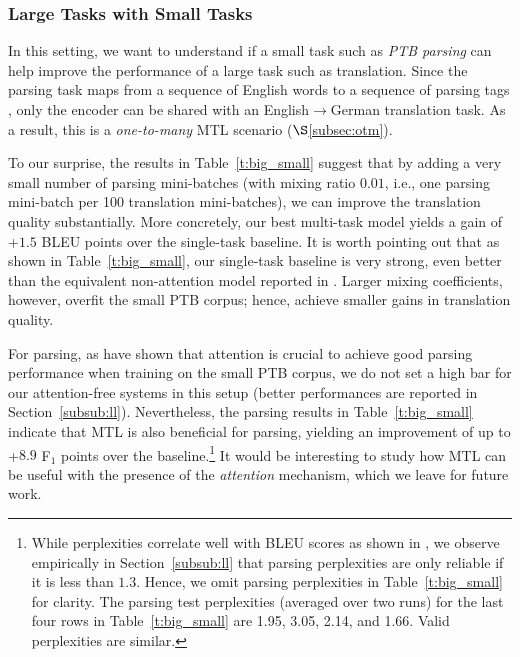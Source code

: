 \subsubsection{Large Tasks with Small Tasks} %
\label{subsubsec:big_small}

In this setting, we want to understand if a small task such as {\it
PTB parsing} can help improve the performance of a large task such as
translation.  Since the parsing task maps from a sequence of English
words to a sequence of parsing tags \citep{vinyals15grammar}, only the
encoder can be shared with an English$\rightarrow$German translation
task.  As a result, this is a {\it one-to-many}
MTL scenario ($\S$\ref{subsec:otm}).

To our surprise, the results in Table~\ref{t:big_small} suggest that
by adding a very small number of parsing mini-batches (with mixing ratio $0.01$,
i.e., one parsing mini-batch per 100 translation mini-batches), we can improve
the translation quality substantially. More concretely,
our best multi-task model yields a gain of +$1.5$ BLEU points over the
single-task baseline. It is worth pointing out that as shown in
Table~\ref{t:big_small}, our single-task baseline is very strong, even better
than the equivalent non-attention model reported in \citep{luong15attn}. Larger
mixing coefficients, however, overfit the small
PTB corpus; hence, achieve smaller gains in translation quality. 

For parsing, as \citet{vinyals15grammar} have shown that attention is crucial to
achieve good parsing performance when training on the small PTB corpus,
we do not set a high bar for our attention-free systems in this setup (better
performances are reported in Section~\ref{subsub:ll}). Nevertheless, the parsing
results in Table~\ref{t:big_small} indicate that MTL is
also beneficial for parsing, yielding an improvement of up to +$8.9$ F$_1$ points
over the baseline.\footnote{While perplexities correlate well with BLEU scores as shown
in \citep{luong15}, we observe empirically in Section~\ref{subsub:ll} that parsing perplexities are only
reliable if it is less than $1.3$. Hence, we omit parsing perplexities in
Table~\ref{t:big_small} for
clarity. The parsing test perplexities (averaged over two
runs) for the last four rows in Table~\ref{t:big_small} are 1.95, 3.05, 2.14, and 1.66. Valid perplexities
are similar.} 
It would be interesting to study how MTL can be
useful with the presence of the {\it attention} mechanism, which we
leave for future work.


